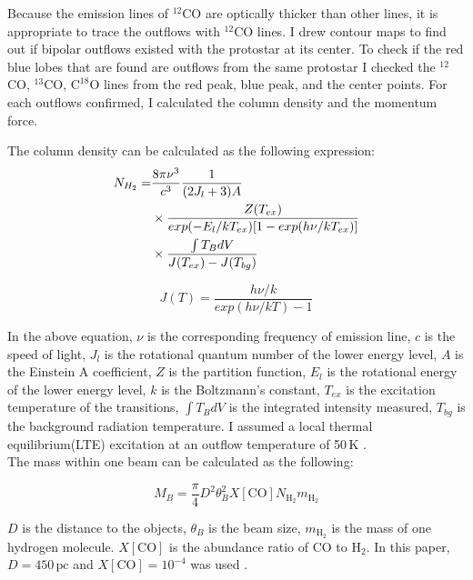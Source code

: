 Because the emission lines of $^{12}$CO are optically thicker than other lines, it is appropriate to trace the outflows with $^{12}$CO lines. I drew contour maps to find out if bipolar outflows existed with the protostar at its center. To check if the red blue lobes that are found are outflows from the same protostar I checked the $^{12}$CO, $^{13}$CO, $\textrm{C}^{18}\textrm{O}$ lines from the red peak, blue peak, and the center points. For each outflows confirmed, I calculated the column density and the momentum force.

The column density can be calculated as the following expression:
\begin{align}
	N_{H_2} =& \frac{8\pi \nu^3}{c^3} \frac{1}{(2J_l +3)A}  \notag \\
	& \times \frac{Z(T_{ex})}{exp(-E_l / kT_{ex})[1-exp(h\nu / kT_{ex})]} \notag \\
	& \times \frac{\int T_B dV}{J(T_{ex})-J(T_{bg})}
\end{align}

\begin{equation}
J(T) = \frac{h \nu / k}{exp(h\nu / kT)-1}
\end{equation}

In the above equation, $\nu$ is the corresponding frequency of emission line, $c$ is the speed of light, $J_l$ is the rotational quantum number of the lower energy level, $A$ is the Einstein A coefficient, $Z$ is the partition function, $E_l$ is the rotational energy of the lower energy level, $k$ is the Boltzmann's constant, $T_{ex}$ is the excitation temperature of the transitions, $\int T_B dV$ is the integrated intensity measured, $T_{bg}$ is the background radiation temperature. I assumed a local thermal equilibrium(LTE) excitation at an outflow temperature of 50$\,$K \cite{takahashi2008millimeter}.\\
The mass within one beam can be calculated as the following:

\begin{equation}
M_B =  \frac{\pi}{4} D^2 \theta_B ^2 X[\textrm{CO}] N_{\textrm{H}_2} m_{\textrm{H}_2}
\end{equation}

$D$ is the distance to the objects, $\theta_B$ is the beam size, $m_{\textrm{H}_2}$ is the mass of one hydrogen molecule. $X[\textrm{CO}]$ is the abundance ratio of CO to $\textrm{H}_2$. In this paper, $D = 450\,\textrm{pc}$ and $X[\textrm{CO}] = 10^{-4}$ was used \cite{hatchell2007star}.\\

